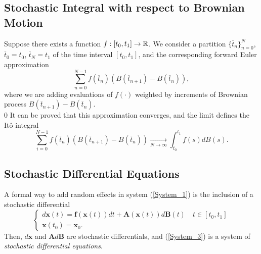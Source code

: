 \subsection{Stochastic Integral with respect to Brownian Motion}

Suppose there exists a function $f:[t_0,t_1]\to\mathbb{R}$. We consider a partition $\{\overline{t}_n\}_{n=0}^N$, $\overline{t}_0=t_0$, $\overline{t}_N=t_1$ of the time interval $[t_0,t_1]$, and the corresponding forward Euler approximation
\begin{equation}
\sum_{n=0}^{N-1}f(\overline{t}_n)(B(\overline{t}_{n+1})-B(\overline{t}_{n})),
\end{equation}
where we are adding evaluations of $f(\cdot)$ weighted by increments of Brownian process $B(\overline{t}_{n+1})-B(\overline{t}_{n})$.\\0
It can be proved that this approximation converges, and the limit defines the It\^o integral
\begin{equation}
\sum_{i=0}^{N-1}f(\overline{t}_n)(B(\overline{t}_{n+1})-B(\overline{t}_{n}))\underset{N\to\infty}{\to}\int_{t_0}^{t_1}f(s)dB(s).
\end{equation}

\subsection{Stochastic Differential Equations} \label{Subsection_SDE}

A formal way to add random effects in system (\ref{System_1}) is the inclusion of a stochastic differential
\begin{equation}
\begin{cases}
d\bm{x}(t)=\bm{f}(\bm{x}(t))dt+\bm{A}(\bm{x}(t))d\bm{B}(t)\quad t\in[t_0,t_1]\\
\bm{x}(t_0)=\bm{x}_0.
\end{cases}
\label{System_3}
\end{equation}
Then, $d\bm{x}$ and $\bm{A}d\bm{B}$ are stochastic differentials, and
(\ref{System_3}) is
 a system of \textit{stochastic differential equations}.\\


